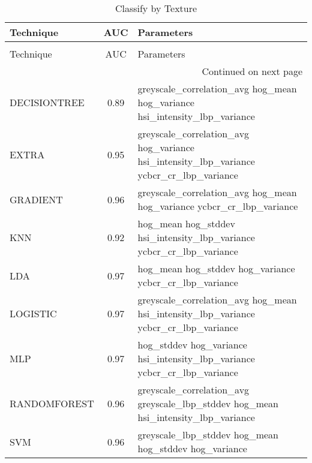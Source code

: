 \begin{longtable}{lcl}
\caption[Classify by Texture]{Classify by Texture}
\label{table:results-texture}\\
\toprule
   Technique &  AUC &                                                                              Parameters \\
\midrule
\endfirsthead
\caption[]{Classify by Texture} \\
\toprule
   Technique &  AUC &                                                                              Parameters \\
\midrule
\endhead
\midrule
\multicolumn{3}{r}{{Continued on next page}} \\
\midrule
\endfoot

\bottomrule
\endlastfoot
DECISIONTREE & 0.89 &              greyscale\_correlation\_avg hog\_mean hog\_variance hsi\_intensity\_lbp\_variance \\
       EXTRA & 0.95 & greyscale\_correlation\_avg hog\_variance hsi\_intensity\_lbp\_variance ycbcr\_cr\_lbp\_variance \\
    GRADIENT & 0.96 &                   greyscale\_correlation\_avg hog\_mean hog\_variance ycbcr\_cr\_lbp\_variance \\
         KNN & 0.92 &                    hog\_mean hog\_stddev hsi\_intensity\_lbp\_variance ycbcr\_cr\_lbp\_variance \\
         LDA & 0.97 &                                  hog\_mean hog\_stddev hog\_variance ycbcr\_cr\_lbp\_variance \\
    LOGISTIC & 0.97 &     greyscale\_correlation\_avg hog\_mean hsi\_intensity\_lbp\_variance ycbcr\_cr\_lbp\_variance \\
         MLP & 0.97 &                hog\_stddev hog\_variance hsi\_intensity\_lbp\_variance ycbcr\_cr\_lbp\_variance \\
RANDOMFOREST & 0.96 &      greyscale\_correlation\_avg greyscale\_lbp\_stddev hog\_mean hsi\_intensity\_lbp\_variance \\
         SVM & 0.96 &                                   greyscale\_lbp\_stddev hog\_mean hog\_stddev hog\_variance \\
\end{longtable}
